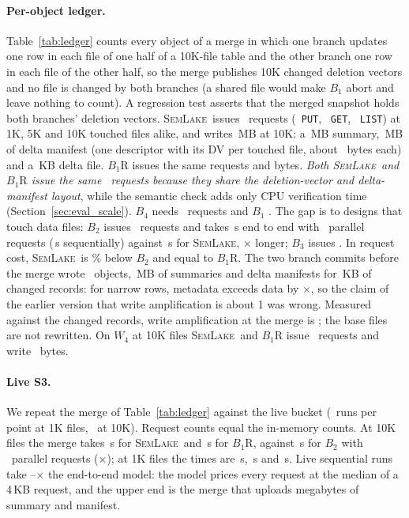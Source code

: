 \documentclass[sigconf, nonacm]{acmart}
\newcommand{\systemname}{\textsc{SemLake}}
\begin{document}
\paragraph{Per-object ledger.} Table~\ref{tab:ledger} counts every object of a merge in which one branch updates one row in each file of one half of a 10K-file table and the other branch one row in each file of the other half, so the merge publishes 10K changed deletion vectors and no file is changed by both branches (a shared file would make $B_1$ abort and leave nothing to count). A regression test asserts that the merged snapshot holds both branches' deletion vectors. \systemname\ issues \LedSemReq\ requests (\LedSemPut\ \texttt{PUT}, \LedSemGet\ \texttt{GET}, \LedSemList\ \texttt{LIST}) at 1K, 5K and 10K touched files alike, and writes \LedSemMB\,MB at 10K: a \LedSemSummaryMB\,MB summary, \LedSemManifestMB\,MB of delta manifest (one descriptor with its DV per touched file, about \LedBytesPerFile\ bytes each) and a \LedSemDataKB\,KB delta file. $B_1\text{R}$ issues the same requests and bytes. \emph{Both \systemname\ and $B_1\text{R}$ issue the same \LedSemReq\ requests because they share the deletion-vector and delta-manifest layout}, while the semantic check adds only CPU verification time (Section~\ref{sec:eval_scale}). $B_4$ needs \LedBfourReq\ requests and $B_1$ \LedBoneReq. The gap is to designs that touch data files: $B_2$ issues \LedBtwoReq\ requests and takes \LedBtwoParS\,s end to end with \LedParallel\ parallel requests (\LedBtwoSeqS\,s sequentially) against \LedSemS\,s for \systemname, \LedBtwoParRatio$\times$ longer; $B_3$ issues \LedBthreeReq. In request cost, \systemname\ is \LedCostCutPct\% below $B_2$ and equal to $B_1\text{R}$. The two branch commits before the merge wrote \LedCommitPut\ objects, \LedCommitMetaMB\,MB of summaries and delta manifests for \LedCommitDataKB\,KB of changed records: for narrow rows, metadata exceeds data by \LedMetaRatio$\times$, so the claim of the earlier version that write amplification is about 1 was wrong. Measured against the changed records, write amplification at the merge is \LedWafMerge; the base files are not rewritten. On $W_4$ at 10K files \systemname\ and $B_1\text{R}$ issue \LedWfourSemReq\ requests and write \LedWfourSemBytes\ bytes.

\paragraph{Live S3.} We repeat the merge of Table~\ref{tab:ledger} against the live bucket (\SthreeVthreeRepeats\ runs per point at 1K files, \SthreeVthreeRepeatsLarge\ at 10K). Request counts equal the in-memory counts. At 10K files the merge takes \SthreeVthreeSemTenS\,s for \systemname\ and \SthreeVthreeBoneRTenS\,s for $B_1\text{R}$, against \SthreeVthreeBtwoTenS\,s for $B_2$ with \LedParallel\ parallel requests (\SthreeVthreeRatioTen$\times$); at 1K files the times are \SthreeVthreeSemOneS\,s, \SthreeVthreeBoneROneS\,s and \SthreeVthreeBtwoOneS\,s. Live sequential runs take \SthreeVthreeCalibLow--\SthreeVthreeCalibHigh$\times$ the end-to-end model: the model prices every request at the median of a 4\,KB request, and the upper end is the merge that uploads megabytes of summary and manifest.
\end{document}
